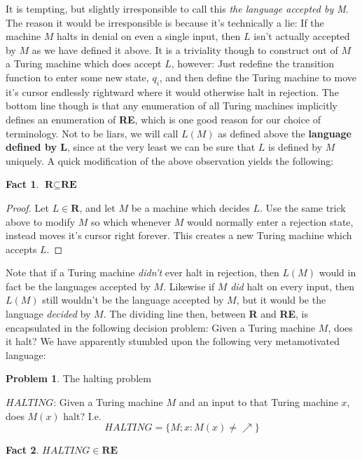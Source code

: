 \documentclass{article}
\theoremstyle{definition}
\newtheorem{problem}{Problem}
\theoremstyle{plain}
\theoremstyle{theorem}
\newtheorem{fact}{Fact}[section]
\begin{document}
It is tempting, but slightly irresponsible to call this \textit{the language accepted by M}. The reason it would be irresponsible is because it's technically a lie: If the machine $M$ halts in denial on even a single input, then $L$ isn't actually accepted by $M$ as we have defined it above. It is a triviality though to construct out of $M$ a Turing machine which does accept $L$, however: Just redefine the transition function to enter some new state, $q_i$, and then define the Turing machine to move it's cursor endlessly rightward where it would otherwise halt in rejection. The bottom line though is that any enumeration of all Turing machines implicitly defines an enumeration of \textbf{RE}, which is one good reason for our choice of terminology. Not to be liars, we will call $L(M)$ as defined above the \textbf{language defined by L}, since at the very least we can be sure that $L$ is defined by $M$ uniquely. A quick modification of the above observation yields the following:
\begin{fact}
    $\textbf{R} \subseteq \textbf{RE}$
\end{fact}
\begin{proof}
    Let $L \in \textbf{R}$, and let $M$ be a machine which decides $L$. Use the same trick above to modify $M$ so which whenever $M$ would normally enter a rejection state, instead moves it's cursor right forever. This creates a new Turing machine which accepts $L$. 
\end{proof}
\par Note that if a Turing machine \textit{didn't} ever halt in rejection, then $L(M)$ would in fact be the languages accepted by $M$. Likewise if $M$ \textit{did} halt on every input, then $L(M)$ still wouldn't be the language accepted by $M$, but it would be the language \textit{decided} by $M$. The dividing line then, between \textbf{R} and \textbf{RE}, is encapsulated in the following decision problem: Given a Turing machine $M$, does it halt? We have apparently stumbled upon the following very metamotivated language:
\begin{problem} The halting problem
    \begin{center}
        $HALTING$: Given a Turing machine $M$ and an input to that Turing machine $x$, does $M(x)$ halt? I.e.
        \[HALTING = \{M;x: M(x) \neq \nearrow\} \]
    \end{center}
\end{problem}
\begin{fact}
    $HALTING \in \textbf{RE}$  
\end{fact}
\end{document}
